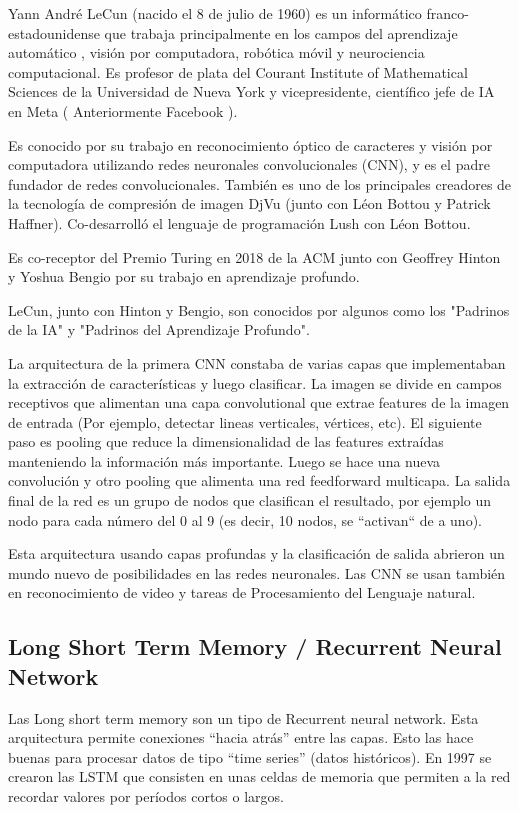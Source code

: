 \documentclass[a4paper]{article}
\begin{document}
Yann André LeCun (nacido el 8 de julio de 1960) es un informático franco-estadounidense que trabaja principalmente en los campos del aprendizaje automático , visión por computadora, robótica móvil y neurociencia computacional. Es profesor de plata del Courant Institute of Mathematical Sciences de la Universidad de Nueva York y vicepresidente, científico jefe de IA en Meta ( Anteriormente Facebook ).

Es conocido por su trabajo en reconocimiento óptico de caracteres y visión por computadora utilizando redes neuronales convolucionales (CNN), y es el padre fundador de redes convolucionales. También es uno de los principales creadores de la tecnología de compresión de imagen DjVu (junto con Léon Bottou y Patrick Haffner). Co-desarrolló el lenguaje de programación Lush con Léon Bottou.

Es co-receptor del Premio Turing en 2018 de la ACM junto con Geoffrey Hinton y Yoshua Bengio por su trabajo en aprendizaje profundo.

LeCun, junto con Hinton y Bengio, son conocidos por algunos como los "Padrinos de la IA" y "Padrinos del Aprendizaje Profundo". 

La arquitectura de la primera CNN constaba de varias capas que implementaban la extracción de características y luego clasificar. La imagen se divide en campos receptivos que alimentan una capa convolutional que extrae features de la imagen de entrada (Por ejemplo, detectar lineas verticales, vértices, etc). El siguiente paso es pooling que reduce la dimensionalidad de las features extraídas manteniendo la información más importante. Luego se hace una nueva convolución y otro pooling que alimenta una red feedforward multicapa. La salida final de la red es un grupo de nodos que clasifican el resultado, por ejemplo un nodo para cada número del 0 al 9 (es decir, 10 nodos, se ``activan`` de a uno).

Esta arquitectura usando capas profundas y la clasificación de salida abrieron un mundo nuevo de posibilidades en las redes neuronales. Las CNN se usan también en reconocimiento de video y tareas de Procesamiento del Lenguaje natural. 

\subsection{Long Short Term Memory / Recurrent Neural Network}
Las Long short term memory son un tipo de Recurrent neural network. Esta arquitectura permite conexiones “hacia atrás” entre las capas. Esto las hace buenas para procesar datos de tipo “time series” (datos históricos). En 1997 se crearon las LSTM que consisten en unas celdas de memoria que permiten a la red recordar valores por períodos cortos o largos.
\end{document}
